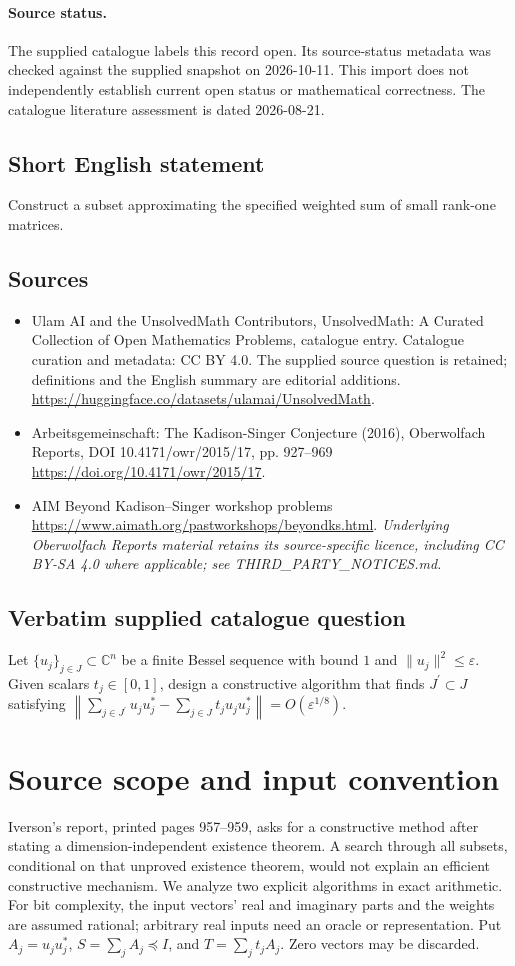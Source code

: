\documentclass[11pt]{article}
\begin{document}
\paragraph{Source status.}
The supplied catalogue labels this record open. Its source-status metadata was checked against the supplied snapshot on 2026-10-11. This import does not independently establish current open status or mathematical correctness. The catalogue literature assessment is dated 2026-08-21.
\subsection{Short English statement}
Construct a subset approximating the specified weighted sum of small rank-one matrices.
\subsection{Sources}
\begin{itemize}
\item[S1] Ulam AI and the UnsolvedMath Contributors, UnsolvedMath: A Curated Collection of Open Mathematics Problems, catalogue entry. Catalogue curation and metadata: CC BY 4.0. The supplied source question is retained; definitions and the English summary are editorial additions.
\url{https://huggingface.co/datasets/ulamai/UnsolvedMath}.
\item[S2] Arbeitsgemeinschaft: The Kadison-Singer Conjecture (2016), Oberwolfach Reports, DOI 10.4171/owr/2015/17, pp. 927--969
\url{https://doi.org/10.4171/owr/2015/17}.
\item[S3] AIM Beyond Kadison--Singer workshop problems
\url{https://www.aimath.org/pastworkshops/beyondks.html}.
\textit{Underlying Oberwolfach Reports material retains its source-specific licence, including CC BY-SA 4.0 where applicable; see THIRD\_PARTY\_NOTICES.md.}
\end{itemize}
\subsection{Verbatim supplied catalogue question}
Let $\{u_j\}_{j\in J}\subset\mathbb{C}^n$ be a finite Bessel sequence with bound $1$ and $\lVert u_j\rVert^2\leq\varepsilon$. Given scalars $t_j\in[0,1]$, design a constructive algorithm that finds $J^\prime\subset J$ satisfying $\left\lVert\sum_{j\in J^\prime}u_ju_j^*-\sum_{j\in J}t_ju_ju_j^*\right\rVert=O(\varepsilon^{1/8})$.

\section{Source scope and input convention}
Iverson's report, printed pages 957--959, asks for a constructive method after
stating a dimension-independent existence theorem. A search through all subsets,
conditional on that unproved existence theorem, would not explain an efficient
constructive mechanism. We analyze two explicit algorithms in exact arithmetic.
For bit complexity, the input vectors' real and imaginary parts and the weights
are assumed rational; arbitrary real inputs need an oracle or representation.
Put $A_j=u_ju_j^*$, $S=\sum_jA_j\preceq I$, and
$T=\sum_jt_jA_j$. Zero vectors may be discarded.
\end{document}
